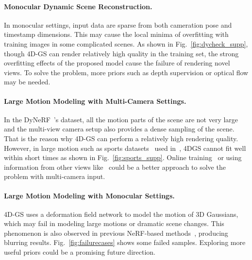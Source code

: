 \paragraph{Monocular Dynamic Scene Reconstruction.}
In monocular settings, input data are sparse from both cameration pose and timestamp dimensions. This may cause the local minima of overfitting with training images in some complicated scenes. As shown in Fig.~\ref{fig:dycheck_supp}, though 4D-GS can render relatively high quality in the training set, the strong overfitting effects of the proposed model cause the failure of rendering novel views. To solve the problem, more priors such as depth supervision or optical flow may be needed.

\paragraph{Large Motion Modeling with Multi-Camera Settings.}
In the DyNeRF~\cite{li2022neural}'s dataset, all the motion parts of the scene are not very large and the multi-view camera setup also provides a dense sampling of the scene. That is the reason why 4D-GS can perform a relatively high rendering quality. However, in large motion such as sports datasets~\cite{joo2015panopticstudio} used in~\cite{dynamic3dgs}, 4DGS cannot fit well within short times as shown in Fig.~\ref{fig:sports_supp}. Online training~\cite{dynamic3dgs,abou2022particlenerf} or using information from other views like~\cite{lin2023im4d,wang2021ibrnet} could be a better approach to solve the problem with multi-camera input.

\paragraph{Large Motion Modeling with Monocular Settings.}
4D-GS uses a deformation field network to model the motion of 3D Gaussians, which may fail in modeling large motions or dramatic scene changes. This phenomenon is also observed in previous NeRF-based methods~\cite{tineuvox,pumarola2021dnerf,park2021hypernerf,li2022neural}, producing blurring results. Fig.~\ref{fig:failurecases} shows some failed samples. Exploring more useful priors could be a promising future direction.


%     
%     
% 


